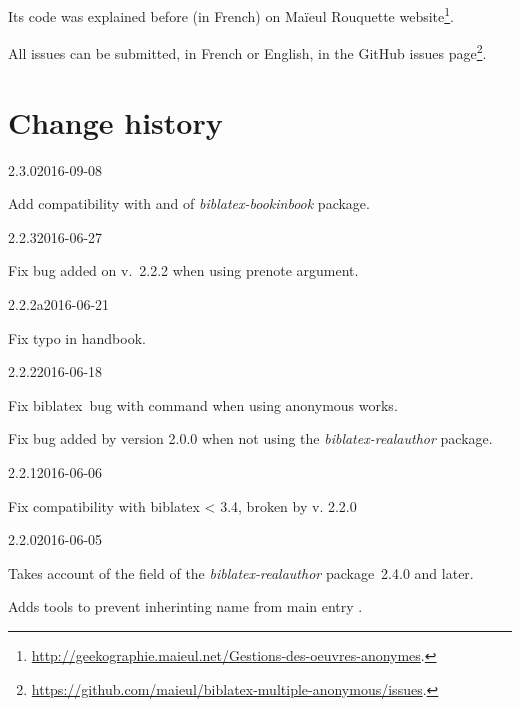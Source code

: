 \documentclass{ltxdockit}[2011/03/25]
\newcommand{\biblatex}{biblatex\xspace}
\begin{document}
Its code was explained before (in French) on Maïeul Rouquette website\footnote{\url{http://geekographie.maieul.net/Gestions-des-oeuvres-anonymes}.}.

All issues can be submitted, in French or English, in the GitHub issues page\footnote{\url{https://github.com/maieul/biblatex-multiple-anonymous/issues}.}.

\section{Change history}

\begin{changelog}

\begin{release}{2.3.0}{2016-09-08}
  \item Add compatibility with  and  of \emph{biblatex-bookinbook} package.
\end{release}

\begin{release}{2.2.3}{2016-06-27}
  \item Fix bug added on v.~2.2.2 when using prenote argument.
 \end{release}

\begin{release}{2.2.2a}{2016-06-21}
  \item Fix typo in handbook.
 \end{release}

\begin{release}{2.2.2}{2016-06-18}
  \item Fix \biblatex\ bug with  \expandafter\cs\expandafter{\prm{xx}cites} command when using anonymous works.
  \item Fix bug added by version 2.0.0 when not using the \emph{biblatex-realauthor} package.
 \end{release}
\begin{release}{2.2.1}{2016-06-06}
 \item Fix compatibility with biblatex < 3.4, broken by v. 2.2.0
\end{release}
\begin{release}{2.2.0}{2016-06-05}
  \item Takes account of the  field of the \emph{biblatex-realauthor} package~2.4.0 and later.
  \item Adds tools to prevent inherinting name from main entry .
\end{release}


\end{changelog}
\end{document}
